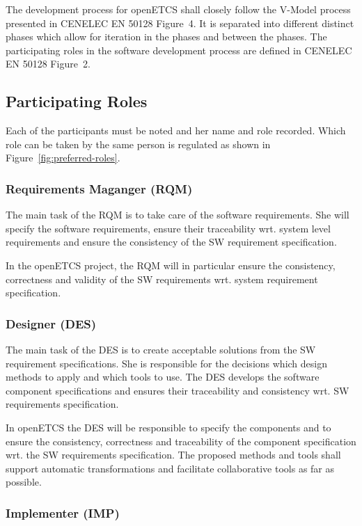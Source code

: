 
The development process for openETCS shall closely follow the V-Model process
presented in CENELEC EN 50128 Figure~4. It is separated into different distinct phases
which allow for iteration in the phases and between the phases. The
participating roles in the software development process are defined in CENELEC
EN 50128 Figure~2.

\subsection{Participating Roles}
\label{sec:participating-roles}

Each of the participants must be noted and her name and role recorded. Which
role can be taken by the same person is regulated as shown in
Figure~\ref{fig:preferred-roles}.

\subsubsection{Requirements Maganger (RQM)}
\label{sec:requ-magang-rqm}

The main task of the RQM is to take care of the software requirements. She will
specify the software requirements, ensure their traceability wrt. system level
requirements and ensure the consistency of the SW requirement specification.

In the openETCS project, the RQM will in particular ensure the consistency,
correctness and validity of the SW requirements wrt. system requirement
specification.

\subsubsection{Designer (DES)}
\label{sec:designer}

The main task of the DES is to create acceptable solutions from the SW
requirement specifications. She is responsible for the decisions which design
methods to apply and which tools to use. The DES develops the software component
specifications and ensures their traceability and consistency wrt. SW
requirements specification.

In openETCS the DES will be responsible to specify the components and to ensure
the consistency, correctness and traceability of the component specification
wrt. the SW requirements specification. The proposed methods and tools shall
support automatic transformations and facilitate collaborative tools as far as
possible.

\subsubsection{Implementer (IMP)}
\label{sec:implementer}

